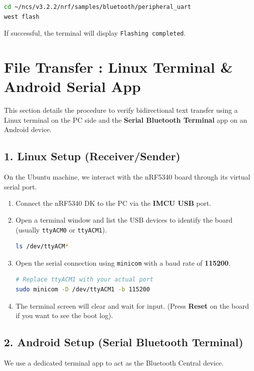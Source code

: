 \documentclass[conference]{IEEEtran}
\begin{document}
\begin{lstlisting}[language=bash]
cd ~/ncs/v3.2.2/nrf/samples/bluetooth/peripheral_uart
west flash
\end{lstlisting}

\noindent If successful, the terminal will display \texttt{Flashing completed}.


\section{File Transfer : Linux Terminal \& Android Serial App}

This section details the procedure to verify bidirectional text transfer using a Linux terminal on the PC side and the \textbf{Serial Bluetooth Terminal} app on an Android device.

\subsection{1. Linux Setup (Receiver/Sender)}
On the Ubuntu machine, we interact with the nRF5340 board through its virtual serial port.

\begin{enumerate}
    \item Connect the nRF5340 DK to the PC via the \textbf{IMCU USB} port.
    \item Open a terminal window and list the USB devices to identify the board (usually \texttt{ttyACM0} or \texttt{ttyACM1}).
\begin{lstlisting}[language=bash]
ls /dev/ttyACM*
\end{lstlisting}
    \item Open the serial connection using \texttt{minicom} with a baud rate of \textbf{115200}.
\begin{lstlisting}[language=bash]
# Replace ttyACM1 with your actual port
sudo minicom -D /dev/ttyACM1 -b 115200
\end{lstlisting}
    \item The terminal screen will clear and wait for input. (Press \textbf{Reset} on the board if you want to see the boot log).
\end{enumerate}

\subsection{2. Android Setup (Serial Bluetooth Terminal)}
We use a dedicated terminal app to act as the Bluetooth Central device.
\end{document}
